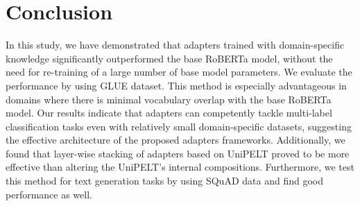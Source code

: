 \documentclass[10pt,twocolumn,letterpaper]{article}
\begin{document}
\section{Conclusion}
In this study, we have demonstrated that adapters trained with domain-specific knowledge  significantly outperformed the base RoBERTa model, without the need for  re-training of a large number of base model parameters. We evaluate the performance by using GLUE dataset. This method is especially advantageous in domains where there is minimal vocabulary overlap with the base RoBERTa model. Our results indicate that adapters can competently tackle multi-label classification tasks even with relatively small domain-specific datasets, suggesting the effective architecture of the proposed adapters frameworks. Additionally, we found that layer-wise stacking of adapters based on UniPELT proved to be more effective than altering the UniPELT's internal compositions. Furthermore, we test this method for text generation tasks by using SQuAD data and find good performance as well. 






















{\small


}
\end{document}
